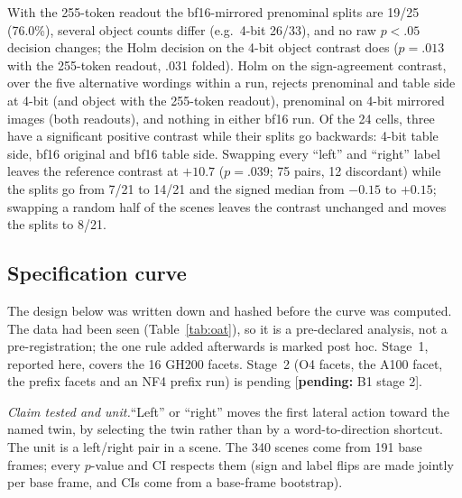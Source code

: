 \documentclass[conference]{IEEEtran}
\newcommand{\pending}[1]{\textcolor{orange!85!black}{[\textbf{pending:} #1]}}
\newcommand{\head}[1]{\textit{#1}\hspace{0.4em}}
\begin{document}
\noindent With the 255-token readout the bf16-mirrored prenominal splits are 19/25 (76.0\%), several object counts differ (e.g.\ 4-bit 26/33), and no raw $p<.05$ decision changes; the Holm decision on the 4-bit object contrast does ($p=.013$ with the 255-token readout, .031 folded). Holm on the sign-agreement contrast, over the five alternative wordings within a run, rejects prenominal and table side at 4-bit (and object with the 255-token readout), prenominal on 4-bit mirrored images (both readouts), and nothing in either bf16 run. Of the 24 cells, three have a significant positive contrast while their splits go backwards: 4-bit table side, bf16 original and bf16 table side. Swapping every ``left'' and ``right'' label leaves the reference contrast at $+10.7$ ($p=.039$; 75 pairs, 12 discordant) while the splits go from 7/21 to 14/21 and the signed median from $-0.15$ to $+0.15$; swapping a random half of the scenes leaves the contrast unchanged and moves the splits to 8/21.

\subsection{Specification curve}
\label{app:curve}

The design below was written down and hashed before the curve was computed. The data had been seen (Table~\ref{tab:oat}), so it is a pre-declared analysis, not a pre-registration; the one rule added afterwards is marked post hoc. Stage~1, reported here, covers the 16 GH200 facets. Stage~2 (O4 facets, the A100 facet, the prefix facets and an NF4 prefix run) is pending \pending{B1 stage 2}.

\head{Claim tested and unit.}``Left'' or ``right'' moves the first lateral action toward the named twin, by selecting the twin rather than by a word-to-direction shortcut. The unit is a left/right pair in a scene. The 340 scenes come from 191 base frames; every $p$-value and CI respects them (sign and label flips are made jointly per base frame, and CIs come from a base-frame bootstrap).
\end{document}

